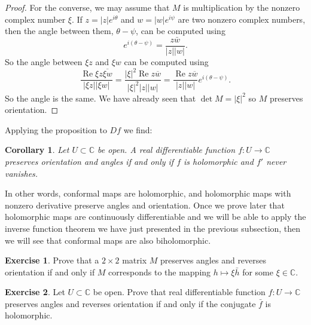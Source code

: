 \documentclass[12pt,openany]{book}
\renewcommand{\Re}{\operatorname{Re}}
\newcommand{\sabs}[1]{\lvert {#1} \rvert}
\newcommand{\C}{{\mathbb{C}}}
\theoremstyle{plain}
\newtheorem{cor}[thm]{Corollary}
\theoremstyle{remark}
\theoremstyle{definition}
\newenvironment{exbox}{%
    \def\FrameCommand{\vrule width 1pt \relax\hspace {10pt}}%
    \MakeFramed {\advance \hsize -\width \FrameRestore }%
}{%
    \endMakeFramed
}
\theoremstyle{exercise}
\newtheorem{exercise}{Exercise}[section]
\theoremstyle{example}
\begin{document}
\begin{proof}
For the converse, we may assume that $M$ is multiplication by the
nonzero complex number $\xi$.
If $z = \sabs{z} e^{i\theta}$ and $w = \sabs{w} e^{i\psi}$ are two nonzero
complex numbers, then the angle between them, $\theta-\psi$, can be
computed using
\begin{equation*}
e^{i(\theta-\psi)}
=
\frac{z\bar{w}}{\sabs{z}\sabs{w}} .
\end{equation*}
So the angle between 
$\xi z$ and $\xi w$ can be computed using
\begin{equation*}
\frac{\Re \xi z\overline{\xi w}}{\sabs{\xi z}\sabs{\xi w}} 
=
\frac{\sabs{\xi}^2 \Re z\overline{w}}{\sabs{\xi}^2 \sabs{z}\sabs{w}} 
=
\frac{\Re z\overline{w}}{\sabs{z}\sabs{w}} e^{i(\theta-\psi)}.
\end{equation*}
So the angle is the same.  We have already seen that $\det M =
\sabs{\xi}^2$ so $M$ preserves orientation.
\end{proof}

Applying the proposition to $Df$ we find:

\begin{cor}
Let $U \subset \C$ be open.
A real differentiable function $f \colon U \to \C$
preserves orientation and angles
if and only if $f$ is holomorphic and $f'$ never vanishes.
\end{cor}

In other words, conformal maps are holomorphic, and holomorphic
maps with nonzero derivative preserve angles and orientation.
Once we prove later that
holomorphic maps are continuously differentiable and we will be able to
apply the inverse function theorem we have just presented in the previous
subsection, then we will see that conformal maps are also biholomorphic.

\begin{exbox}
\begin{exercise}
Prove that a $2 \times 2$ matrix $M$ preserves angles and reverses
orientation if and only if $M$ corresponds to the mapping $h \mapsto \xi
\bar{h}$ for some $\xi \in \C$.
\end{exercise}

\begin{exercise}
Let $U \subset \C$ be open.
Prove that real differentiable function $f \colon U \to \C$ preserves angles
and reverses orientation if and only if the conjugate $\bar{f}$ is
holomorphic.
\end{exercise}
\end{exbox}

\end{document}
